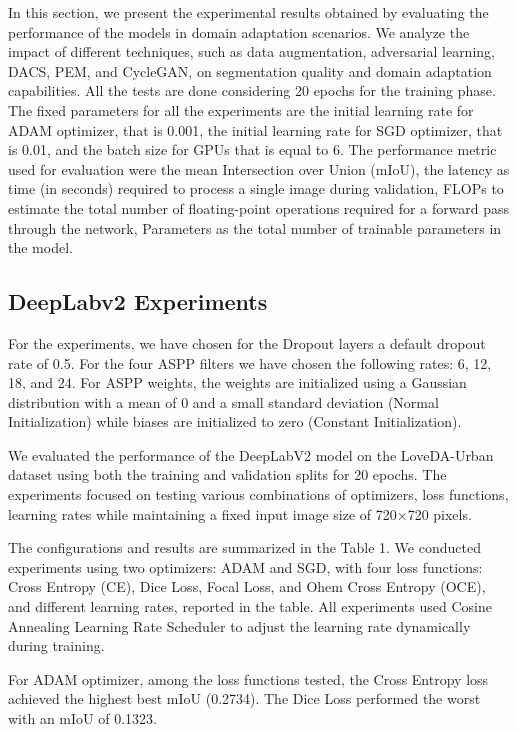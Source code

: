 \documentclass[10pt,twocolumn,letterpaper]{article}
\begin{document}
In this section, we present the experimental results obtained by evaluating the performance of the models in domain adaptation scenarios. We analyze the impact of different techniques, such as data augmentation, adversarial learning, DACS, PEM, and CycleGAN, on segmentation quality and domain adaptation capabilities. All the tests are done considering 20 epochs for the training phase. The fixed parameters for all the experiments are the initial learning rate for ADAM optimizer, that is 0.001, the initial learning rate for SGD optimizer, that is 0.01, and the batch size for GPUs that is equal to 6. The performance metric used for evaluation were the mean Intersection over Union (mIoU), the latency as time (in seconds) required to process a single image during validation, FLOPs to estimate the total number of floating-point operations required for a forward pass through the network, Parameters as the total number of trainable parameters in the model.

\subsection{DeepLabv2 Experiments}

For the experiments, we have chosen for the Dropout layers a default dropout rate of 0.5. For the four ASPP filters we have chosen the following rates: 6, 12, 18, and 24. For ASPP weights, the weights are initialized using a Gaussian distribution with a mean of 0 and a small standard deviation (Normal Initialization) while biases are initialized to zero (Constant Initialization). 

We evaluated the performance of the DeepLabV2 model on the LoveDA-Urban dataset using both the training and validation splits for 20 epochs. The experiments focused on testing various combinations of optimizers, loss functions, learning rates while maintaining a fixed input image size of 720×720 pixels. 

The configurations and results are summarized in the Table 1. We conducted experiments using two optimizers: ADAM and SGD, with four loss functions: Cross Entropy (CE), Dice Loss, Focal Loss, and Ohem Cross Entropy (OCE), and different learning rates, reported in the table. All experiments used Cosine Annealing Learning Rate Scheduler to adjust the learning rate dynamically during training. 

For ADAM optimizer, among the loss functions tested, the Cross Entropy loss achieved the highest best mIoU (0.2734). The Dice Loss performed the worst with an mIoU of 0.1323.
\end{document}
